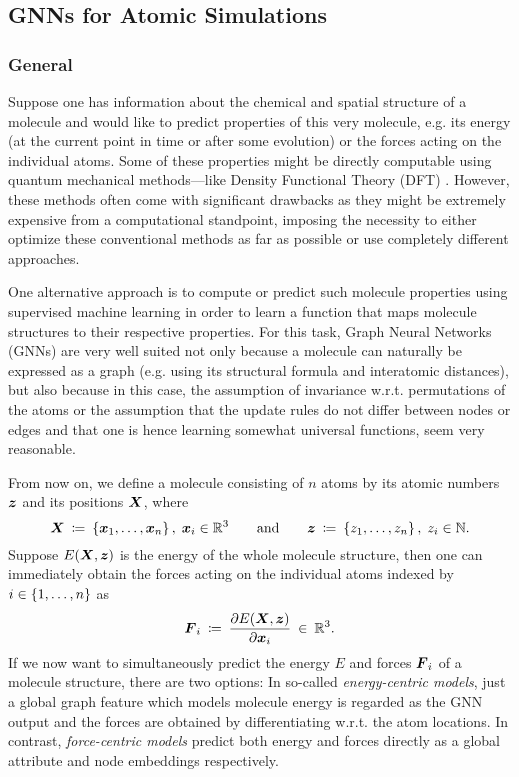 \subsection{GNNs for Atomic Simulations}
\label{subsec:atomic-simulations}

\subsubsection{General}
\label{subsubsec:atomic-simulations-general}

Suppose one has information about the chemical and spatial structure of a molecule 
and would like to predict properties of this very molecule, e.g. its energy (at the 
current point in time or after some evolution) or the forces acting on the 
individual atoms. Some of these properties might be directly
computable using quantum mechanical methods---like Density Functional Theory (DFT) 
\cite{doi:10.1021/ed5004788}. However, these methods often come
with significant drawbacks as they might be extremely expensive from a computational 
standpoint, imposing the necessity to either optimize these conventional methods 
as far as possible or use completely different approaches.

One alternative approach is to compute or 
predict such molecule properties using supervised
machine learning in order to learn a function that maps molecule structures to their
respective properties. For this task, Graph
Neural Networks (GNNs) are very well suited not only because a molecule can naturally
be expressed as a graph (e.g. using its structural formula and
interatomic distances), but also because in this case, the 
assumption of invariance w.r.t. permutations of the atoms or the assumption that 
the update rules do not differ between nodes or edges and that one is hence
learning somewhat universal functions, seem very reasonable.

From now on, we define a molecule consisting of $n$ atoms by its atomic numbers 
$\boldsymbol{z}$ and its positions $\boldsymbol{X}$, where
\begin{equation}
    \boldsymbol{X} \: \coloneqq \: \left\{\boldsymbol{x}_1, \dots, \boldsymbol{x}_n\right\}, \; \boldsymbol{x}_i \in \mathbb{R}^3
    \qquad \text{and} \qquad 
    \boldsymbol{z} \: \coloneqq \: \left\{z_1, \dots, z_n\right\}, \; z_i \in \mathbb{N} \text{.}
    \label{eq:molecule_setup}
\end{equation}
Suppose $E(\boldsymbol{X}, \boldsymbol{z})$ is the energy of the whole molecule structure, then one can immediately
obtain the forces acting on the individual atoms indexed by $i \in \left\{1, \dots, n\right\}$ as
\[
    \boldsymbol{F}_i \: \coloneqq \: \frac{\partial E(\boldsymbol{X}, \boldsymbol{z})}{\partial \boldsymbol{x}_i} \: \in \: \mathbb{R}^3 \text{.}
\]
If we now want to simultaneously predict the energy $E$ and forces $\boldsymbol{F}_i$
of a molecule structure, there are two options: In so-called 
\textit{energy-centric models}, just a global graph feature which models molecule energy
is regarded as the GNN output and the forces are obtained by differentiating w.r.t.
the atom locations. In contrast, \textit{force-centric models} predict both energy and forces
directly as a global attribute and node embeddings respectively.

